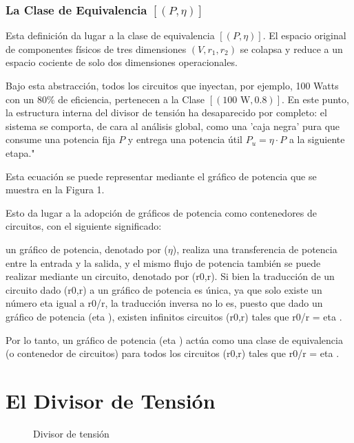 \documentclass[11pt, a4paper]{article}
\theoremstyle{definition}
\theoremstyle{plain}
\theoremstyle{plain}
\theoremstyle{remark}
\theoremstyle{remark}
\theoremstyle{remark}
\begin{document}
\subsubsection*{La Clase de Equivalencia $[(P, \eta)]$}

Esta definición da lugar a la clase de equivalencia $[(P, \eta)]$. El espacio original de componentes físicos de tres dimensiones $(V, r_1, r_2)$ se colapsa y reduce a un espacio cociente de solo dos dimensiones operacionales.

Bajo esta abstracción, todos los circuitos que inyectan, por ejemplo, 100 Watts con un 80\% de eficiencia, pertenecen a la Clase $[(100\text{ W}, 0.8)]$. En este punto, la estructura interna del divisor de tensión ha desaparecido por completo: el sistema se comporta, de cara al análisis global, como una 'caja negra' pura que consume una potencia fija $P$ y entrega una potencia útil $P_u = \eta \cdot P$ a la siguiente etapa."



Esta ecuación se puede representar mediante el gráfico de potencia que se muestra en la Figura 1.

Esto da lugar a la adopción de gráficos de potencia como contenedores de circuitos, con el siguiente significado:

un gráfico de potencia, denotado por ($\eta$), realiza una transferencia de potencia entre la entrada y la salida, y el mismo flujo de potencia también se puede realizar mediante un circuito, denotado por (r0,r). Si bien la traducción de un circuito dado (r0,r) a un gráfico de potencia es única, ya que solo existe un número eta	 igual a r0/r, la traducción inversa no lo es, puesto que dado un gráfico de potencia (eta	), existen infinitos circuitos (r0,r) tales que r0/r = eta	.

Por lo tanto, un gráfico de potencia (eta	) actúa como una clase de equivalencia (o contenedor de circuitos) para todos los circuitos {(r0,r)} tales que r0/r = eta	.




{\color{red} \section{El Divisor de Tensión}}


\begin{figure}[h!]
	\centering
	\caption{Divisor de tensión}
	\label{fig:circuitvr1r2sch1}
\end{figure}
\end{document}
